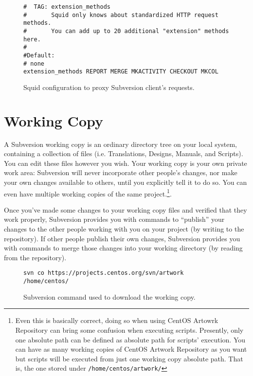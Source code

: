 \begin{figure}[!hbp]
\hrulefill
\begin{verbatim}
#  TAG: extension_methods
#       Squid only knows about standardized HTTP request methods.
#       You can add up to 20 additional "extension" methods here.
#
#Default:
# none
extension_methods REPORT MERGE MKACTIVITY CHECKOUT MKCOL
\end{verbatim}
\hrulefill
\caption{Squid configuration to proxy Subversion client's requests.%
   \label{fig:Workstation:Configuration:Squid}}
\end{figure}

\section{Working Copy}

A Subversion working copy is an ordinary directory tree on your local
system, containing a collection of files (i.e.  Translations, Designs,
Manuals, and Scripts). You can edit these files however you wish. Your
working copy is your own private work area: Subversion will never
incorporate other people's changes, nor make your own changes
available to others, until you explicitly tell it to do so.  You can
even have multiple working copies of the same project.\footnote{Even
this is basically correct, doing so when using CentOS Artowrk
Repository can bring some confusion when executing scripts. Presently,
only one absolute path can be defined as absolute path for scripts'
execution.  You can have as many working copies of CentOS Artwork
Repository as you want but scripts will be executed from just one
working copy absolute path. That is, the one stored under
\texttt{/home/centos/artwork/}}.

Once you've made some changes to your working copy files and verified
that they work properly, Subversion provides you with commands to
``publish'' your changes to the other people working with you on your
project (by writing to the repository). If other people publish their
own changes, Subversion provides you with commands to merge those
changes into your working directory (by reading from the repository).

\begin{figure}[!hbp]
\hrulefill
\begin{verbatim}
svn co https://projects.centos.org/svn/artwork /home/centos/
\end{verbatim}
\hrulefill
\caption{Subversion command used to download the working copy.%
   \label{fig:Workstation:WC:Download}}
\end{figure}

